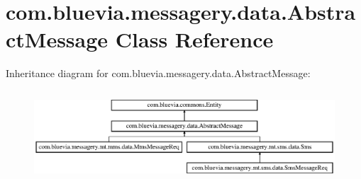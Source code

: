 \hypertarget{classcom_1_1bluevia_1_1messagery_1_1data_1_1AbstractMessage}{
\section{com.bluevia.messagery.data.AbstractMessage Class Reference}
\label{classcom_1_1bluevia_1_1messagery_1_1data_1_1AbstractMessage}
}
Inheritance diagram for com.bluevia.messagery.data.AbstractMessage:\begin{figure}[H]
\begin{center}
\leavevmode
\includegraphics[height=3.425076cm]{classcom_1_1bluevia_1_1messagery_1_1data_1_1AbstractMessage}
\end{center}
\end{figure}
